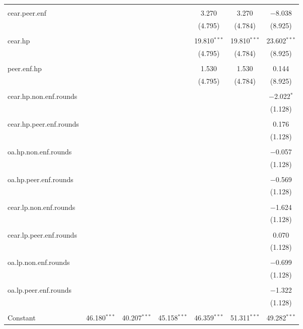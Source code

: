 \documentclass[
]{article}
\begin{document}
\begin{table}[!htbp]
\begin{tabular}{@{\extracolsep{5pt}}lcccccc}
  & & & & & & \\ 
 cear.peer.enf &  &  &  & 3.270 & 3.270 & $-$8.038 \\ 
  &  &  &  & (4.795) & (4.784) & (8.925) \\ 
  & & & & & & \\ 
 cear.hp &  &  &  & 19.810$^{***}$ & 19.810$^{***}$ & 23.602$^{***}$ \\ 
  &  &  &  & (4.795) & (4.784) & (8.925) \\ 
  & & & & & & \\ 
 peer.enf.hp &  &  &  & 1.530 & 1.530 & 0.144 \\ 
  &  &  &  & (4.795) & (4.784) & (8.925) \\ 
  & & & & & & \\ 
 cear.hp.non.enf.rounds &  &  &  &  &  & $-$2.022$^{*}$ \\ 
  &  &  &  &  &  & (1.128) \\ 
  & & & & & & \\ 
 cear.hp.peer.enf.rounds &  &  &  &  &  & 0.176 \\ 
  &  &  &  &  &  & (1.128) \\ 
  & & & & & & \\ 
 oa.hp.non.enf.rounds &  &  &  &  &  & $-$0.057 \\ 
  &  &  &  &  &  & (1.128) \\ 
  & & & & & & \\ 
 oa.hp.peer.enf.rounds &  &  &  &  &  & $-$0.569 \\ 
  &  &  &  &  &  & (1.128) \\ 
  & & & & & & \\ 
 cear.lp.non.enf.rounds &  &  &  &  &  & $-$1.624 \\ 
  &  &  &  &  &  & (1.128) \\ 
  & & & & & & \\ 
 cear.lp.peer.enf.rounds &  &  &  &  &  & 0.070 \\ 
  &  &  &  &  &  & (1.128) \\ 
  & & & & & & \\ 
 oa.lp.non.enf.rounds &  &  &  &  &  & $-$0.699 \\ 
  &  &  &  &  &  & (1.128) \\ 
  & & & & & & \\ 
 oa.lp.peer.enf.rounds &  &  &  &  &  & $-$1.322 \\ 
  &  &  &  &  &  & (1.128) \\ 
  & & & & & & \\ 
 Constant & 46.180$^{***}$ & 40.207$^{***}$ & 45.158$^{***}$ & 46.359$^{***}$ & 51.311$^{***}$ & 49.282$^{***}$ \\ 

\end{tabular}
\end{table}
\end{document}
